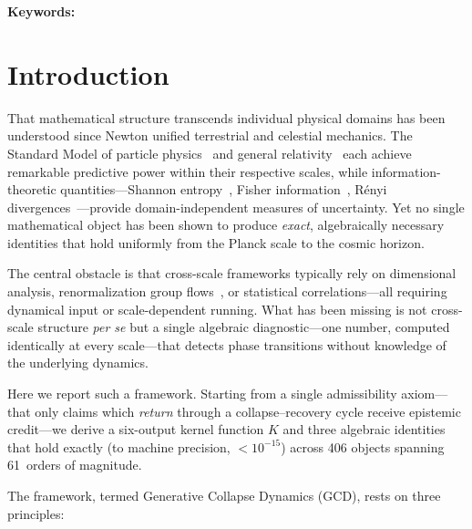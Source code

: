\documentclass[11pt]{article}
\begin{document}
\maketitle

\noindent\textbf{Keywords:} \keywords

\section{Introduction}

That mathematical structure transcends individual physical domains has
been understood since Newton unified terrestrial and celestial
mechanics. The Standard Model of particle
physics~\cite{pdg2024} and general relativity~\cite{einstein1916gr}
each achieve remarkable predictive power within their respective
scales, while information-theoretic quantities---Shannon
entropy~\cite{shannon1948}, Fisher information~\cite{fisher1925,
rao1945information}, R\'{e}nyi divergences~\cite{renyi1961measures}---provide
domain-independent measures of uncertainty. Yet no single mathematical
object has been shown to produce \emph{exact}, algebraically necessary
identities that hold uniformly from the Planck scale to the cosmic
horizon.

The central obstacle is that cross-scale frameworks typically rely on
dimensional analysis, renormalization group
flows~\cite{gross1973,politzer1973}, or statistical correlations---all
requiring dynamical input or scale-dependent running. What has
been missing is not cross-scale structure \emph{per se} but a single
algebraic diagnostic---one number, computed identically at every
scale---that detects phase transitions without knowledge of the
underlying dynamics.

Here we report such a framework. Starting from a single admissibility
axiom---that only claims which \emph{return} through a
collapse--recovery cycle receive epistemic credit---we derive a
six-output kernel function $K$ and three algebraic identities that
hold exactly (to machine precision, $<10^{-15}$) across 406
objects spanning 61~orders of magnitude.

The framework, termed Generative Collapse Dynamics (GCD), rests on
three principles:
\end{document}
